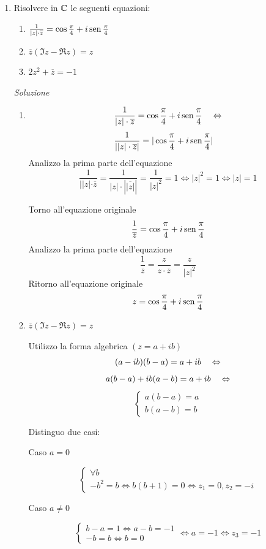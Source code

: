 \documentclass{article}
\begin{document}
\begin{enumerate}[label=\textbf{Esercizio 3.\arabic*.},itemindent=*]
    \item Risolvere in $\mathbb{C}$ le seguenti equazioni: 
        \begin{enumerate}
            \item $\frac{1}{|z|\cdot \overline{z}}=\cos\frac{\pi}{4}+i\text{\textnormal{\,sen\,}} \frac{\pi}{4}$
            \item $\overline{z}(\Im z-\Re z)=z$
            \item $2z^2+\overline{z}=-1$
        \end{enumerate}

    \item[\textit{\large Soluzione~}]~
        \begin{enumerate}
        
        
        \item
        \[\frac{1}{|z|\cdot \overline{z}}=\cos\frac{\pi}{4}+i\text{\textnormal{\,sen\,}} \frac{\pi}{4}~~~\Leftrightarrow\]
        \[\frac{1}{||z|\cdot\overline{z}|}=|\cos\frac{\pi}{4}+i\text{\textnormal{\,sen\,}}\frac{\pi}{4}|~~~\]
        Analizzo la prima parte dell'equazione
        \[\frac{1}{||z|\cdot\overline{z}}=\frac{1}{|z|\cdot|\overline{|z|}|}=\frac{1}{|z|^2}=1\Leftrightarrow|z|^2=1\Leftrightarrow |z|=1\]

        Torno all'equazione originale
        \[\frac{1}{\overline{z}}=\cos\frac{\pi}{4}+i\text{\textnormal{\,sen\,}} \frac{\pi}{4}\]
        Analizzo la prima parte dell'equazione
        \[\frac{1}{\overline{z}}=\frac{z}{z\cdot\overline{z}}=\frac{z}{|z|^2}\]
        Ritorno all'equazione originale
        \[z=\cos\frac{\pi}{4}+i\text{\textnormal{\,sen\,}} \frac{\pi}{4}\]
    

        \item $\overline{z}(\Im z-\Re z)=z$
        \par Utilizzo la forma algebrica $(z=a+ib)$
        \[(a-ib)(b-a)=a+ib~~~\Leftrightarrow\]\[a(b-a)+ib(a-b)=a+ib~~~\Leftrightarrow\]
        \[\begin{cases}
        a(b-a)=a \\ b(a-b)=b
        \end{cases} \]
        \par
        Distinguo due casi: \par
        Caso $a=0$
        \par
        \[\begin{cases}
        \forall b \\ -b^2=b\Leftrightarrow b(b+1)=0\Leftrightarrow z_1=0,z_2=-i
        \end{cases}\] 
        \par Caso $a\neq 0$
        \par
        \[\begin{cases}
        b-a=1\Leftrightarrow a-b=-1 \\ -b=b\Leftrightarrow b=0
        \end{cases} \Leftrightarrow a=-1\Leftrightarrow z_3=-1\]
        


\end{enumerate}
\end{enumerate}
\end{document}
